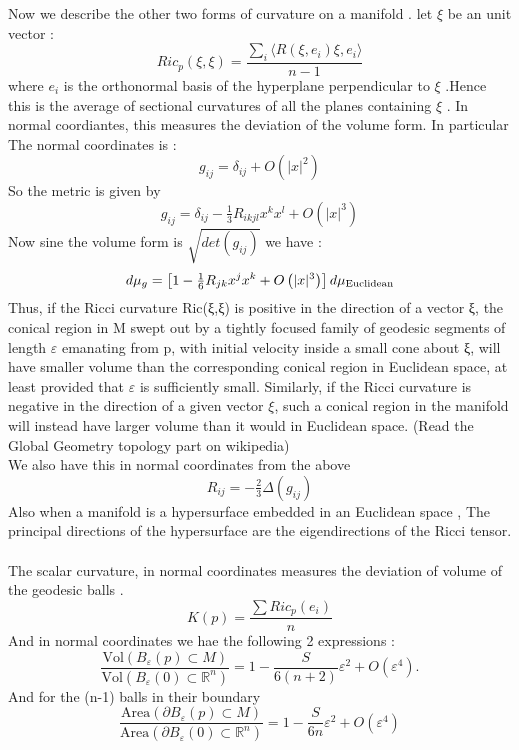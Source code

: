 \documentclass[psamsfonts]{amsart}
\theoremstyle{definition}
\theoremstyle{remark}
\numberwithin{equation}{section}
\begin{document}
Now we describe the other two forms of curvature on a manifold . let $\xi$ be an unit vector :
\[ Ric_{p}(\xi , \xi ) =   \dfrac{\sum_{i}\langle R(\xi , e_{i})\xi , e_{i}\rangle}{n-1}                                     \]
where $e_{i}$ is the orthonormal basis of the hyperplane perpendicular to $\xi$ .Hence this is the average of sectional curvatures of all the planes containing $\xi$ . In normal coordiantes, this measures the deviation of the volume form. In particular The normal coordinates is :
\[   g_{ij}=\delta _{ij}+O\left(|x|^{2}\right)   \]
So the metric is given by 
\[    g_{ij}=\delta _{ij}-{\tfrac {1}{3}}R_{ikjl}x^{k}x^{l}+O\left(|x|^{3}\right)               \]
Now sine the volume form is $\sqrt{det (g_{ij})}$ we have :
\[ d\mu _{g}=\left[1-{\tfrac {1}{6}}R_{jk}x^{j}x^{k}+O\left(|x|^{3}\right)\right]d\mu _{\rm {Euclidean}}                 \]
Thus, if the Ricci curvature Ric(ξ,ξ) is positive in the direction of a vector ξ, the conical region in M swept out by a tightly focused family of geodesic segments of length $ \varepsilon$  emanating from p, with initial velocity inside a small cone about ξ, will have smaller volume than the corresponding conical region in Euclidean space, at least provided that $ \varepsilon $  is sufficiently small. Similarly, if the Ricci curvature is negative in the direction of a given vector $\xi$, such a conical region in the manifold will instead have larger volume than it would in Euclidean space. (Read the Global Geometry topology part on wikipedia)\\
We also have this in normal coordinates from the above
\[       R_{ij}=-{\tfrac {2}{3}}\Delta \left(g_{ij}\right)              \] 
Also when a manifold is a hypersurface embedded in an Euclidean space , The principal directions of the hypersurface are the eigendirections of the Ricci tensor.\\ \\
The scalar curvature, in normal coordinates measures the deviation of volume of the geodesic balls .
\[       K(p) = \dfrac{\sum Ric_{p}(e_{i})}{n}                           \]
And in normal coordinates we hae the following 2 expressions :
\[               \frac {\text{Vol} (B_{\varepsilon }(p)\subset M)}{\text{Vol} (B_{\varepsilon }(0)\subset {\mathbb {R} }^{n})}=1-\frac {S}{6(n+2)}\varepsilon ^{2}+O(\varepsilon ^{4}).                    \]
And for the (n-1) balls in their boundary
\[{\frac {\text {Area} (\partial B_{\varepsilon }(p)\subset M)}{\text {Area} (\partial B_{\varepsilon }(0)\subset {\mathbb {R} }^{n})}}=1-{\frac {S}{6n}}\varepsilon ^{2}+O(\varepsilon ^{4})
\]
\end{document}
